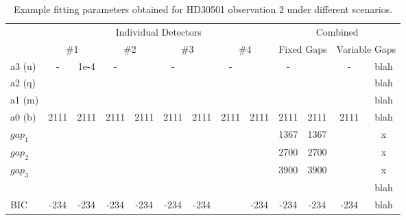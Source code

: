 \begin{table}
    \small
    \caption{Example fitting parameters obtained for HD30501 observation 2 under different scenarios.}
    \begin{tabular}{|l|c|c|c|c|c|c|c|c|c|c|c|c|}
    	\toprule
    	  &    \multicolumn{8}{c|}{Individual Detectors}    &    \multicolumn{4}{c|}{Combined}    \\
    	  & \multicolumn{2}{c|}{\#1} & \multicolumn{2}{c|}{\#2} & \multicolumn{2}{c|}{\#3} & \multicolumn{2}{c|}{\#4} & \multicolumn{2}{c|}{Fixed Gaps} & \multicolumn{2}{c|}{Variable Gaps} \\ \midrule
    	a3 (u)    &  -   &    1e-4    &  -   &    &  -   &    &  -   &    &  -   &    &  -   &    blah    \\
    	a2 (q)    &      &    &    &    &    &    &    &    &    &    &    &    blah    \\
    	a1 (m)   &      &    &    &    &    &    &    &    &    &    &    &    blah    \\
    	a0 (b)    & 2111 &    2111    & 2111 &    2111    & 2111 &    2111    & 2111 &    2111    & 2111 &    2111    & 2111 & blah \\
        \(gap_{1}\) &      &    &    &    &    &    &    &    &   1367  & 1367   &   & x\\
        \(gap_{2}\) &      &    &    &    &    &    &    &    &  2700   &  2700  &   & x\\
        \(gap_{3}\) &      &    &    &    &    &    &    &    &   3900 &   3900 &    & x\\
    	\textchisquared{} &    &    &    &    &    &    &    &    &    &    &    &    blah    \\
    	BIC        & -234      &    -234    & -234 &    -234    & -234 &    -234    &    &    -234    & -234 &    -234    & -234 &    blah  \\
        \bottomrule
    \end{tabular}\label{tab:example_calibration_parametres}
\end{table}


